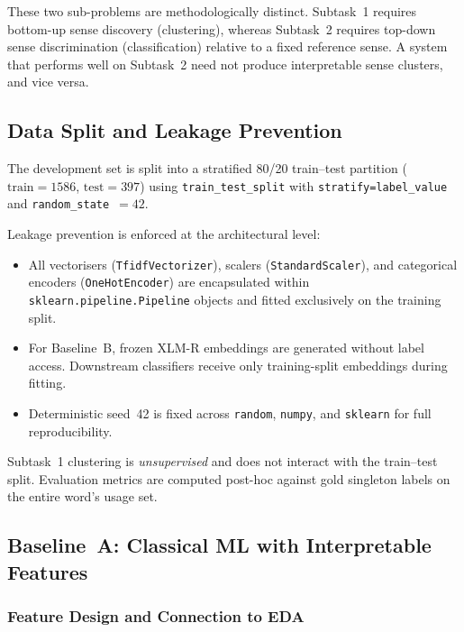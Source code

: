 These two sub-problems are methodologically distinct.
Subtask~1 requires bottom-up sense discovery (clustering), whereas Subtask~2
requires top-down sense discrimination (classification) relative to a fixed
reference sense.  A system that performs well on Subtask~2 need not produce
interpretable sense clusters, and vice versa.


\subsection{Data Split and Leakage Prevention}
\label{sec:baselines:split}

The development set is split into a stratified 80/20 train--test partition
($\text{train}=1586$, $\text{test}=397$) using \texttt{train\_test\_split}
with \texttt{stratify=label\_value} and \texttt{random\_state}~$=42$.

Leakage prevention is enforced at the architectural level:
\begin{itemize}
  \item All vectorisers (\texttt{TfidfVectorizer}), scalers
    (\texttt{StandardScaler}), and categorical encoders (\texttt{OneHotEncoder})
    are encapsulated within \texttt{sklearn.pipeline.Pipeline} objects and
    fitted exclusively on the training split.
  \item For Baseline~B, frozen XLM-R embeddings are generated without label
    access.  Downstream classifiers receive only training-split embeddings
    during fitting.
  \item Deterministic seed~42 is fixed across \texttt{random}, \texttt{numpy},
    and \texttt{sklearn} for full reproducibility.
\end{itemize}

Subtask~1 clustering is \emph{unsupervised} and does not interact with the
train--test split.  Evaluation metrics are computed post-hoc against gold
singleton labels on the entire word's usage set.


\subsection{Baseline~A: Classical ML with Interpretable Features}

\subsubsection{Feature Design and Connection to EDA}
\label{sec:baselines:features}

